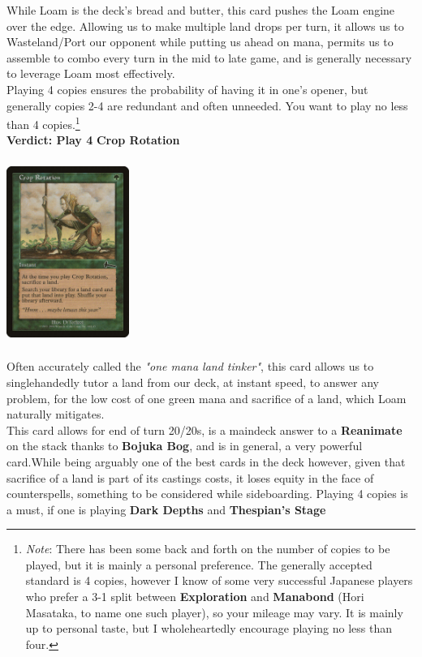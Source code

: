 \documentclass{report}
\begin{document}
While Loam is the deck's bread and butter, this card pushes the Loam engine over the edge. Allowing us to make multiple land drops per turn, it allows us to Wasteland/Port our opponent while putting us ahead on mana, permits us to assemble to combo every turn in the mid to late game, and is generally necessary to leverage Loam most effectively.\\Playing 4 copies ensures the probability of having it in one's opener, but generally copies 2-4 are redundant and often unneeded. You want to play no less than 4 copies.\footnote{\emph{Note}: There has been some back and forth on the number of copies to be played, but it is mainly a personal preference. The generally accepted standard is 4 copies,  however I know of some very successful Japanese players who prefer a 3-1 split between \textbf{Exploration} and \textbf{Manabond} (Hori Masataka, to name one such player), so your mileage may vary. It is mainly up to personal taste, but I wholeheartedly encourage playing no less than four.}\\
\textbf{Verdict: Play 4}
\newpage
\textbf{Crop Rotation}\\
\begin{center}
\includegraphics [width = 4cm, height = 6cm] {crop-rotation}\\
\end{center}
Often accurately called the \emph{"one mana land tinker"}, this card allows us to singlehandedly tutor a land from our deck, at instant speed, to answer any problem, for the low cost of one green mana and sacrifice of a land, which Loam naturally mitigates.\\This card allows for end of turn 20/20s, is a maindeck answer to a \textbf{Reanimate} on the stack thanks to \textbf{Bojuka Bog}, and is in general, a very powerful card.While being arguably one of the best cards in the deck however, given that sacrifice of a land is part of its castings costs, it loses equity in the face of counterspells, something to be considered while sideboarding. Playing 4 copies is a must, if one is playing \textbf{Dark Depths} and \textbf{Thespian's Stage}\\
\end{document}
